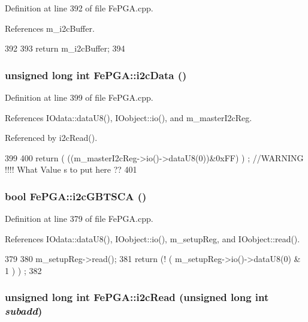 Definition at line 392 of file FePGA.cpp.

References m\_\-i2cBuffer.


\begin{DoxyCode}
392                                   {
393   return m_i2cBuffer;
394 }
\end{DoxyCode}
\hypertarget{classFePGA_a9c261a09d323c07ec4b9e925d4dfc353}{
\subsubsection[{i2cData}]{\setlength{\rightskip}{0pt plus 5cm}unsigned long int FePGA::i2cData ()}}
\label{classFePGA_a9c261a09d323c07ec4b9e925d4dfc353}


Definition at line 399 of file FePGA.cpp.

References IOdata::dataU8(), IOobject::io(), and m\_\-masterI2cReg.

Referenced by i2cRead().


\begin{DoxyCode}
399                                 {
400   return ( ((m_masterI2cReg->io()->dataU8(0))&0xFF) ) ; //WARNING !!!! What Value
      s to put here ??
401 }
\end{DoxyCode}
\hypertarget{classFePGA_a210cf57766c4f818ea61af671e91cfeb}{
\subsubsection[{i2cGBTSCA}]{\setlength{\rightskip}{0pt plus 5cm}bool FePGA::i2cGBTSCA ()}}
\label{classFePGA_a210cf57766c4f818ea61af671e91cfeb}


Definition at line 379 of file FePGA.cpp.

References IOdata::dataU8(), IOobject::io(), m\_\-setupReg, and IOobject::read().


\begin{DoxyCode}
379                       {
380   m_setupReg->read();
381   return (! ( m_setupReg->io()->dataU8(0) & 1 ) ) ;
382 }
\end{DoxyCode}
\hypertarget{classFePGA_adf1c43786131d0f500b4662a877229c7}{
\subsubsection[{i2cRead}]{\setlength{\rightskip}{0pt plus 5cm}unsigned long int FePGA::i2cRead (unsigned long int {\em subadd})}}
\label{classFePGA_adf1c43786131d0f500b4662a877229c7}


